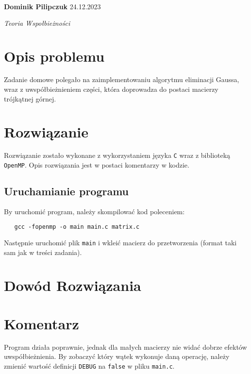 \documentclass[11pt]{article}
\begin{document}
\textbf{Dominik Pilipczuk} \hfill 24.12.2023

\textit{Teoria Wspołbieżności}
\section{Opis problemu}
Zadanie domowe polegało na zaimplementowaniu algorytmu eliminacji Gaussa,
wraz z uwspółbieżnieniem części, która doprowadza do postaci macierzy trójkątnej
górnej.
\section{Rozwiązanie}
Rozwiązanie zostało wykonane z wykorzystaniem języka \texttt{C}
wraz z biblioteką \texttt{OpenMP}. Opis rozwiązania jest w postaci komentarzy
w kodzie.
\subsection{Uruchamianie programu}
By uruchomić program, należy skompilować kod poleceniem:
\begin{verbatim}
   gcc -fopenmp -o main main.c matrix.c 
\end{verbatim}
Następnie uruchomić plik \texttt{main} i wkleić macierz do przetworzenia
(format taki sam jak w treści zadania).
\section{Dowód Rozwiązania}
\section{Komentarz}
Program działa poprawnie, jednak dla małych macierzy nie widać dobrze efektów
uwspółbieżnienia. By zobaczyć który wątek wykonuje daną operację, należy zmienić
wartość definicji \texttt{DEBUG} na \texttt{false} w pliku \texttt{main.c}.
\end{document}
